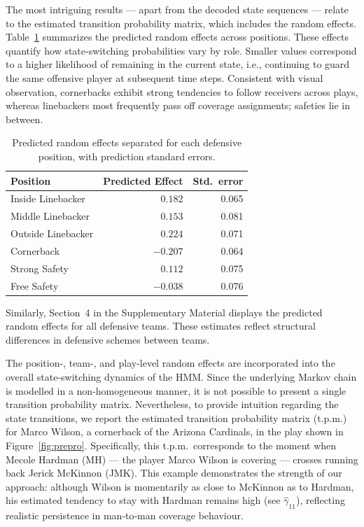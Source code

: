 \documentclass[namedate,webpdf,modern,medium]{oup-authoring-template}
\begin{document}
The most intriguing results --- apart from the decoded state sequences --- relate to the estimated transition probability matrix, which includes the random effects. Table~\ref{tab:position_effects} summarizes the predicted random effects across positions. These effects quantify how state-switching probabilities vary by role. Smaller values correspond to a higher likelihood of remaining in the current state, i.e., continuing to guard the same offensive player at subsequent time steps. Consistent with visual observation, cornerbacks exhibit strong tendencies to follow receivers across plays, whereas linebackers most frequently pass off coverage assignments; safeties lie in between.

\begin{table}[b!]
\centering
\caption{Predicted random effects separated for each defensive position, with prediction standard errors.}
\label{tab:position_effects}
\begin{tabular}{lrr}
\hline
Position & Predicted Effect & Std.\ error \\
\hline
Inside Linebacker & $\ \ \ 0.182$ & 0.065 \\
Middle Linebacker & $\ \ \ 0.153$ & 0.081 \\
Outside Linebacker & $\ \ \ 0.224$ & 0.071 \\
Cornerback & $-0.207$ & 0.064 \\
Strong Safety & $\ \ \ 0.112$ & 0.075 \\
Free Safety & $-0.038$ & 0.076 \\
\hline
\end{tabular}
\end{table}

Similarly, Section~4 in the Supplementary Material displays the predicted random effects for all defensive teams. These estimates reflect structural differences in defensive schemes between teams. 

The position-, team-, and play-level random effects are incorporated into the overall state-switching dynamics of the HMM. Since the underlying Markov chain is modelled in a non-homogeneous manner, it is not possible to present a single transition probability matrix. Nevertheless, to provide intuition regarding the state transitions, we report the estimated transition probability matrix (t.p.m.) for Marco Wilson, a cornerback of the Arizona Cardinals, in the play shown in Figure~\ref{fig:prepro}. Specifically, this t.p.m.\ corresponds to the moment when Mecole Hardman (MH) --- the player Marco Wilson is covering --- crosses running back Jerick McKinnon (JMK). This example demonstrates the strength of our approach: although Wilson is momentarily as close to McKinnon as to Hardman, his estimated tendency to stay with Hardman remains high (see $\hat{\gamma}_{11}$), reflecting realistic persistence in man‑to‑man coverage behaviour.
\end{document}
